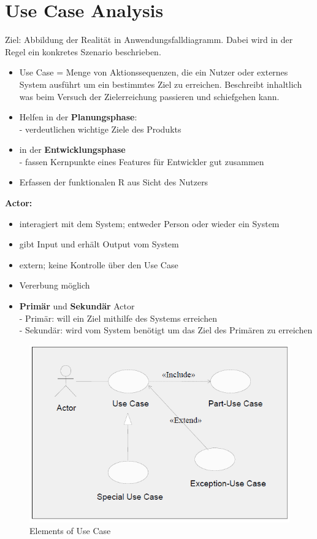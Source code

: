 \section{Use Case Analysis}
Ziel: Abbildung der Realität in Anwendungsfalldiagramm. Dabei wird in der Regel ein konkretes Szenario beschrieben.
\begin{itemize}
	\item Use Case = Menge von Aktionssequenzen, die ein Nutzer oder externes System ausführt um ein bestimmtes Ziel zu erreichen. Beschreibt inhaltlich was beim Versuch der Zielerreichung passieren und schiefgehen kann.
	\item Helfen in der \textbf{Planungsphase}:\\
	- verdeutlichen wichtige Ziele des Produkts
	\item in der \textbf{Entwicklungsphase}\\
	- fassen Kernpunkte eines Features für Entwickler gut zusammen
	\item Erfassen der funktionalen R aus Sicht des Nutzers
\end{itemize}

\textbf{Actor:}
\begin{itemize}
	\item interagiert mit dem System; entweder Person oder wieder ein System
	\item gibt Input und erhält Output vom System
	\item extern; keine Kontrolle über den Use Case
	\item Vererbung möglich
	\item \textbf{Primär} und \textbf{Sekundär} Actor\\
	- Primär: will ein Ziel mithilfe des Systems erreichen\\
	- Sekundär: wird vom System benötigt um das Ziel des Primären zu erreichen
\end{itemize}

\begin{figure}[!h]
	\centering
	\includegraphics[scale=0.6]{img/elements_of_use_case.png}
	\caption{Elements of Use Case}
\end{figure}

